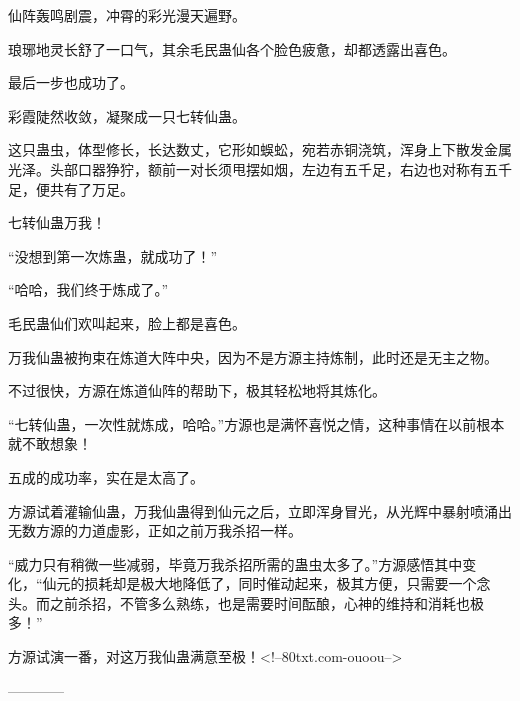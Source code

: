 \begin{this_body}
仙阵轰鸣剧震，冲霄的彩光漫天遍野。

琅琊地灵长舒了一口气，其余毛民蛊仙各个脸色疲惫，却都透露出喜色。

最后一步也成功了。

彩霞陡然收敛，凝聚成一只七转仙蛊。

这只蛊虫，体型修长，长达数丈，它形如蜈蚣，宛若赤铜浇筑，浑身上下散发金属光泽。头部口器狰狞，额前一对长须甩摆如烟，左边有五千足，右边也对称有五千足，便共有了万足。

七转仙蛊万我！

“没想到第一次炼蛊，就成功了！”

“哈哈，我们终于炼成了。”

毛民蛊仙们欢叫起来，脸上都是喜色。

万我仙蛊被拘束在炼道大阵中央，因为不是方源主持炼制，此时还是无主之物。

不过很快，方源在炼道仙阵的帮助下，极其轻松地将其炼化。

“七转仙蛊，一次性就炼成，哈哈。”方源也是满怀喜悦之情，这种事情在以前根本就不敢想象！

五成的成功率，实在是太高了。

方源试着灌输仙蛊，万我仙蛊得到仙元之后，立即浑身冒光，从光辉中暴射喷涌出无数方源的力道虚影，正如之前万我杀招一样。

“威力只有稍微一些减弱，毕竟万我杀招所需的蛊虫太多了。”方源感悟其中变化，“仙元的损耗却是极大地降低了，同时催动起来，极其方便，只需要一个念头。而之前杀招，不管多么熟练，也是需要时间酝酿，心神的维持和消耗也极多！”

方源试演一番，对这万我仙蛊满意至极！<!--80txt.com-ouoou-->

------------

\end{this_body}

